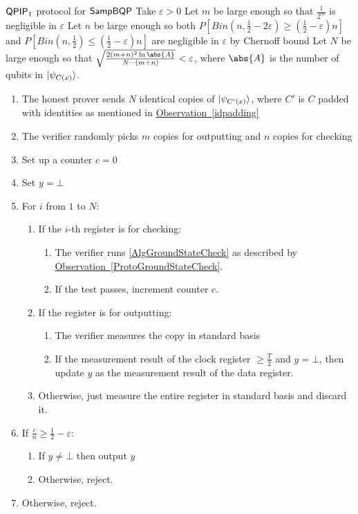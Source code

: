 \begin{protocol}{$\operatorname{\mathsf{QPIP}}_1$ protocol for $\operatorname{\mathsf{SampBQP}}$}
	\label{ProtoQPIP1}
	Take $\varepsilon>0$
	Let $m$ be large enough so that $\frac{1}{2^m}$ is negligible in $\varepsilon$
	Let $n$ be large enough so both $P\left[Bin(n, \frac{1}{2}-2\varepsilon)\geq\left(\frac{1}{2}-\varepsilon\right)n\right]$ and $P\left[Bin(n, \frac{1}{2})\leq\left(\frac{1}{2}-\varepsilon\right)n\right]$ are negligible in $\varepsilon$ by Chernoff bound
	Let $N$ be large enough so that $\sqrt{\frac{2(m+n)^2\ln\abs{A}}{N-(m+n)}}<\varepsilon$, where $\abs{A}$ is the number of qubits in $\ket{\psi_{C(x)}}$.
	\begin{enumerate}
		\item The honest prover sends $N$ identical copies of $\ket{\psi_{C'(x)}}$, where $C'$ is $C$ padded with identities as mentioned in \hyperref[idpadding]{Observation~\ref*{idpadding}}
		\item The verifier randomly picks $m$ copies for outputting and $n$ copies for checking
		\item Set up a counter $c=0$
		\item Set $y=\bot$
		\item For $i$ from $1$ to $N$:
		\begin{enumerate}
			\item If the $i$-th register is for checking:
			\begin{enumerate}
				\item The verifier runs \autoref{AlgGroundStateCheck} as described by \hyperref[ProtoGroundStateCheck]{Observation~\ref*{ProtoGroundStateCheck}}.
				\item If the test passes, increment counter $c$.
			\end{enumerate}
			\item If the register is for outputting:
			\begin{enumerate}
				\item The verifier measures the copy in standard basis
				\item If the measurement result of the clock register $\geq\frac{T}{2}$ and $y=\bot$, then update $y$ as the measurement result of the data register.
			\end{enumerate}
			\item Otherwise, just measure the entire register in standard basis and discard it.
		\end{enumerate}
		\item If $\frac{c}{n}\geq\frac{1}{2}-\varepsilon$:
		\begin{enumerate}
			\item If $y\ne\bot$ then output $y$
			\item Otherwise, reject.
		\end{enumerate}
		\item Otherwise, reject.
	\end{enumerate}
\end{protocol}


